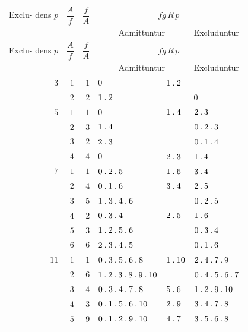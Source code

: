 \clearpage
\begingroup\fontsize{8.3}{9.2}\selectfont\setlength{\tabcolsep}{2pt}\renewcommand{\arraystretch}{1.00}
\begin{longtable}{r|r|r|p{113pt}|p{29pt}|p{120pt}}
\hline
\shortstack{Exclu-\\dens\\$p$} & $\dfrac{A}{f}$ & $\dfrac{f}{A}$ & \multicolumn{3}{c}{$fg\,R\,p$}\\\cline{4-6}
& & & \multicolumn{2}{c|}{Admittuntur} & Excluduntur\\\hline
\endfirsthead
\shortstack{Exclu-\\dens\\$p$} & $\dfrac{A}{f}$ & $\dfrac{f}{A}$ & \multicolumn{3}{c}{$fg\,R\,p$}\\\cline{4-6}
& & & \multicolumn{2}{c|}{Admittuntur} & Excluduntur\\\hline
\endhead
$3$ & $1$ & $1$ & $0$ & $1\mathbin{.} 2$ & \\
 & $2$ & $2$ & $1\mathbin{.} 2$ &  & $0$\\
$5$ & $1$ & $1$ & $0$ & $1\mathbin{.} 4$ & $2\mathbin{.} 3$\\
 & $2$ & $3$ & $1\mathbin{.} 4$ &  & $0\mathbin{.} 2\mathbin{.} 3$\\
 & $3$ & $2$ & $2\mathbin{.} 3$ &  & $0\mathbin{.} 1\mathbin{.} 4$\\
 & $4$ & $4$ & $0$ & $2\mathbin{.} 3$ & $1\mathbin{.} 4$\\
$7$ & $1$ & $1$ & $0\mathbin{.} 2\mathbin{.} 5$ & $1\mathbin{.} 6$ & $3\mathbin{.} 4$\\
 & $2$ & $4$ & $0\mathbin{.} 1\mathbin{.} 6$ & $3\mathbin{.} 4$ & $2\mathbin{.} 5$\\
 & $3$ & $5$ & $1\mathbin{.} 3\mathbin{.} 4\mathbin{.} 6$ &  & $0\mathbin{.} 2\mathbin{.} 5$\\
 & $4$ & $2$ & $0\mathbin{.} 3\mathbin{.} 4$ & $2\mathbin{.} 5$ & $1\mathbin{.} 6$\\
 & $5$ & $3$ & $1\mathbin{.} 2\mathbin{.} 5\mathbin{.} 6$ &  & $0\mathbin{.} 3\mathbin{.} 4$\\
 & $6$ & $6$ & $2\mathbin{.} 3\mathbin{.} 4\mathbin{.} 5$ &  & $0\mathbin{.} 1\mathbin{.} 6$\\
$11$ & $1$ & $1$ & $0\mathbin{.} 3\mathbin{.} 5\mathbin{.} 6\mathbin{.} 8$ & $1\mathbin{.} 10$ & $2\mathbin{.} 4\mathbin{.} 7\mathbin{.} 9$\\
 & $2$ & $6$ & $1\mathbin{.} 2\mathbin{.} 3\mathbin{.} 8\mathbin{.} 9\mathbin{.} 10$ &  & $0\mathbin{.} 4\mathbin{.} 5\mathbin{.} 6\mathbin{.} 7$\\
 & $3$ & $4$ & $0\mathbin{.} 3\mathbin{.} 4\mathbin{.} 7\mathbin{.} 8$ & $5\mathbin{.} 6$ & $1\mathbin{.} 2\mathbin{.} 9\mathbin{.} 10$\\
 & $4$ & $3$ & $0\mathbin{.} 1\mathbin{.} 5\mathbin{.} 6\mathbin{.} 10$ & $2\mathbin{.} 9$ & $3\mathbin{.} 4\mathbin{.} 7\mathbin{.} 8$\\
 & $5$ & $9$ & $0\mathbin{.} 1\mathbin{.} 2\mathbin{.} 9\mathbin{.} 10$ & $4\mathbin{.} 7$ & $3\mathbin{.} 5\mathbin{.} 6\mathbin{.} 8$\\

\end{longtable}
